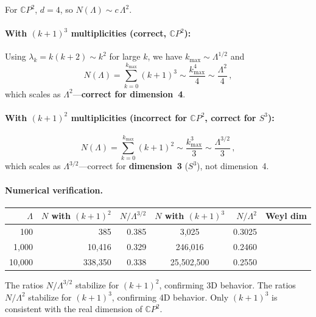 \documentclass[11pt]{article}
\theoremstyle{remark}
\begin{document}
For $\mathbb{C}P^2$, $d = 4$, so $N(\Lambda) \sim c\,\Lambda^2$.

\paragraph{With $(k+1)^3$ multiplicities (correct, $\mathbb{C}P^2$):}
Using $\lambda_k = k(k+2) \sim k^2$ for large $k$, we have
$k_{\max} \sim \Lambda^{1/2}$ and
\begin{equation}
N(\Lambda) = \sum_{k=0}^{k_{\max}} (k+1)^3
\sim \frac{k_{\max}^4}{4}
\sim \frac{\Lambda^2}{4}\,,
\end{equation}
which scales as $\Lambda^2$---\textbf{correct for dimension~4}.

\paragraph{With $(k+1)^2$ multiplicities (incorrect for $\mathbb{C}P^2$,
correct for $S^3$):}
\begin{equation}
N(\Lambda) = \sum_{k=0}^{k_{\max}} (k+1)^2
\sim \frac{k_{\max}^3}{3}
\sim \frac{\Lambda^{3/2}}{3}\,,
\end{equation}
which scales as $\Lambda^{3/2}$---correct for \textbf{dimension~3} ($S^3$),
not dimension~4.

\paragraph{Numerical verification.}
\begin{center}
\begin{tabular}{rrrcrc}
\toprule
$\Lambda$ & $N$ with $(k+1)^2$ & $N/\Lambda^{3/2}$
          & $N$ with $(k+1)^3$ & $N/\Lambda^2$ & Weyl dim \\
\midrule
   100 &       385 & 0.385 &      3,025 & 0.3025 & \\
 1,000 &    10,416 & 0.329 &    246,016 & 0.2460 & \\
10,000 &   338,350 & 0.338 & 25,502,500 & 0.2550 & \\
\bottomrule
\end{tabular}
\end{center}

The ratios $N/\Lambda^{3/2}$ stabilize for $(k+1)^2$, confirming 3D behavior.
The ratios $N/\Lambda^2$ stabilize for $(k+1)^3$, confirming 4D behavior.
Only $(k+1)^3$ is consistent with the real dimension of $\mathbb{C}P^2$.

\end{document}
